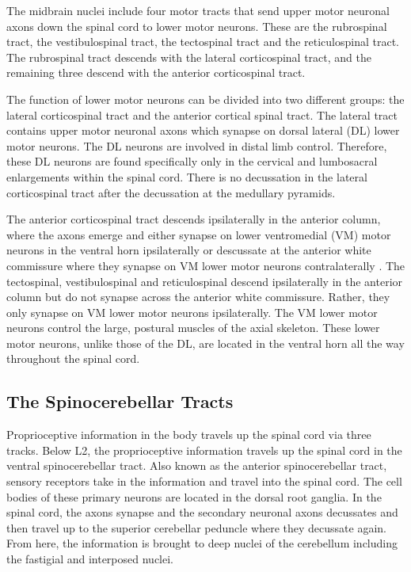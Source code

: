 \documentclass[]{book}
\begin{document}
The midbrain nuclei include four motor tracts that send upper motor neuronal axons down the spinal cord to lower motor neurons. These are the rubrospinal tract, the vestibulospinal tract, the tectospinal tract and the reticulospinal tract. The rubrospinal tract descends with the lateral corticospinal tract, and the remaining three descend with the anterior corticospinal tract.

The function of lower motor neurons can be divided into two different groups: the lateral corticospinal tract and the anterior cortical spinal tract. The lateral tract contains upper motor neuronal axons which synapse on dorsal lateral (DL) lower motor neurons. The DL neurons are involved in distal limb control. Therefore, these DL neurons are found specifically only in the cervical and lumbosacral enlargements within the spinal cord. There is no decussation in the lateral corticospinal tract after the decussation at the medullary pyramids.

The anterior corticospinal tract descends ipsilaterally in the anterior column, where the axons emerge and either synapse on lower ventromedial (VM) motor neurons in the ventral horn ipsilaterally or descussate at the anterior white commissure where they synapse on VM lower motor neurons contralaterally . The tectospinal, vestibulospinal and reticulospinal descend ipsilaterally in the anterior column but do not synapse across the anterior white commissure. Rather, they only synapse on VM lower motor neurons ipsilaterally. The VM lower motor neurons control the large, postural muscles of the axial skeleton. These lower motor neurons, unlike those of the DL, are located in the ventral horn all the way throughout the spinal cord.

\hypertarget{the-spinocerebellar-tracts}{%
\subsection{The Spinocerebellar Tracts}\label{the-spinocerebellar-tracts}}

Proprioceptive information in the body travels up the spinal cord via three tracks. Below L2, the proprioceptive information travels up the spinal cord in the ventral spinocerebellar tract. Also known as the anterior spinocerebellar tract, sensory receptors take in the information and travel into the spinal cord. The cell bodies of these primary neurons are located in the dorsal root ganglia. In the spinal cord, the axons synapse and the secondary neuronal axons decussates and then travel up to the superior cerebellar peduncle where they decussate again. From here, the information is brought to deep nuclei of the cerebellum including the fastigial and interposed nuclei.
\end{document}
